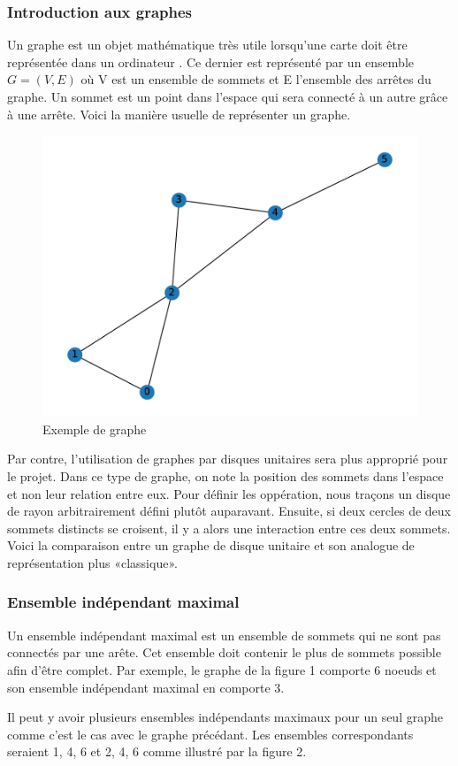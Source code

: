 \documentclass[11pt]{article}
\begin{document}
\subsubsection{Introduction aux graphes}
Un graphe est un objet mathématique très utile lorsqu'une carte doit être représentée dans un ordinateur \cite{mackaness_use_1993}\cite{riaz_applications_2011}. Ce dernier est représenté par un ensemble $G=(V,E)$ où V est un ensemble de sommets et E l'ensemble des arrêtes du graphe. Un sommet est un point dans l'espace qui sera connecté à un autre grâce à une arrête. Voici la manière usuelle de représenter un graphe.

\begin{figure}[H]
    \centering
        \includegraphics[width=0.45\linewidth]{images/graphe_MIS_exemple.pdf}
        \caption{Exemple de graphe}
    \label{graph_exemple}
\end{figure}

Par contre, l'utilisation de graphes par disques unitaires sera plus approprié pour le projet. Dans ce type de graphe, on note la position des sommets dans l'espace et non leur relation entre eux. Pour définir les oppération, nous traçons un disque de rayon arbitrairement défini plutôt auparavant. Ensuite, si deux cercles de deux sommets distincts se croisent, il y a alors une interaction entre ces deux sommets. Voici la comparaison entre un graphe de disque unitaire et son analogue de représentation plus «classique».  

\subsubsection{Ensemble indépendant maximal}
Un ensemble indépendant maximal est un ensemble de sommets qui ne sont pas connectés par une arête. Cet ensemble doit contenir le plus de sommets possible afin d'être complet. Par exemple, le graphe de la figure 1 comporte 6 noeuds et son ensemble indépendant maximal en comporte 3.
 
Il peut y avoir plusieurs ensembles indépendants maximaux pour un seul graphe comme c'est le cas avec le graphe précédant. Les ensembles correspondants seraient {1, 4, 6} et {2, 4, 6} comme illustré par la figure 2.
\end{document}
